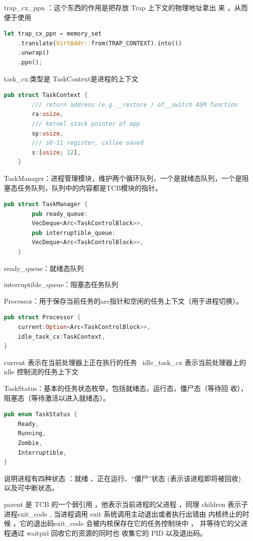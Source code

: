 trap\_cx\_ppn ：这个东西的作用是把存放 Trap 上下文的物理地址拿出
来 ，从而便于使用

\begin{lstlisting}[language=Rust]
	let trap_cx_ppn = memory_set
	.translate(VirtAddr::from(TRAP_CONTEXT).into())
	.unwrap()
	.ppn();
\end{lstlisting}	
	
	task\_cx:类型是 TaskContext是进程的上下文

\begin{lstlisting}[language=Rust]
	pub struct TaskContext {
		/// return address (e.g.__restore ) of__switch ASM function
		ra:usize,
		/// kernel stack pointer of app
		sp:usize,
		/// s0-11 register, callee saved
		s:[usize; 12],
	}
\end{lstlisting}

TaskManager：进程管理模块，维护两个循环队列，一个是就绪态队列，一个是阻
塞态任务队列，队列中的内容都是TCB模块的指针。
\begin{lstlisting}[language=Rust]
	pub struct TaskManager {
		pub ready_queue:
		VecDeque<Arc<TaskControlBlock>>,
		pub interruptible_queue:
		VecDeque<Arc<TaskControlBlock>>,
	}
\end{lstlisting}
ready\_queue：就绪态队列

interruptible\_queue：阻塞态任务队列

Processor：用于保存当前任务的arc指针和空闲的任务上下文（用于进程切换）。
\begin{lstlisting}[language=Rust]
	pub struct Processor {
	current:Option<Arc<TaskControlBlock>>,
	idle_task_cx:TaskContext,
}
\end{lstlisting}
current 表示在当前处理器上正在执行的任务
\
idle\_task\_cx 表示当前处理器上的 idle 控制流的任务上下文

TaskStatus：基本的任务状态枚举，包括就绪态，运行态，僵尸态（等待回
收），阻塞态（等待激活以进入就绪态）。
\begin{lstlisting}[language=Rust]
	pub enum TaskStatus {
	Ready,
	Running,
	Zombie,
	Interruptible,
}
\end{lstlisting}

说明进程有四种状态 ：就绪 、正在运行、“僵尸”状态  (表示该进程即将被回收)  
以及可中断状态。

parent 是 TCB 的一个弱引用 ，他表示当前进程的父进程 ，同理 children 表示子进程exit\_code , 当进程调用  exit 系统调用主动退出或者执行出错由
内核终止的时候 ，它的退出码exit\_code 会被内核保存在它的任务控制块中 ，
并等待它的父进程通过  waitpid 回收它的资源的同时也 收集它的 PID 以及退出码。

